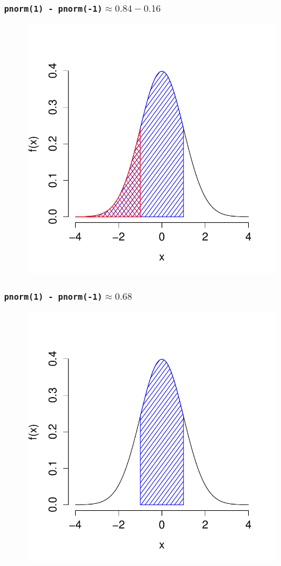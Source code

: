 \documentclass[handout]{beamer}
\begin{document}
\begin{frame}
\frametitle{\texttt{pnorm(1) - pnorm(-1)}$\approx 0.84 - 0.16$}
\begin{figure}
\includegraphics[scale = 0.65]{./images/middle68_2}
\end{figure}
\end{frame}
\begin{frame}
\frametitle{\texttt{pnorm(1) - pnorm(-1)}$\approx 0.68$}
\begin{figure}
\includegraphics[scale = 0.65]{./images/middle68_3}
\end{figure}
\end{frame}
\end{document}
